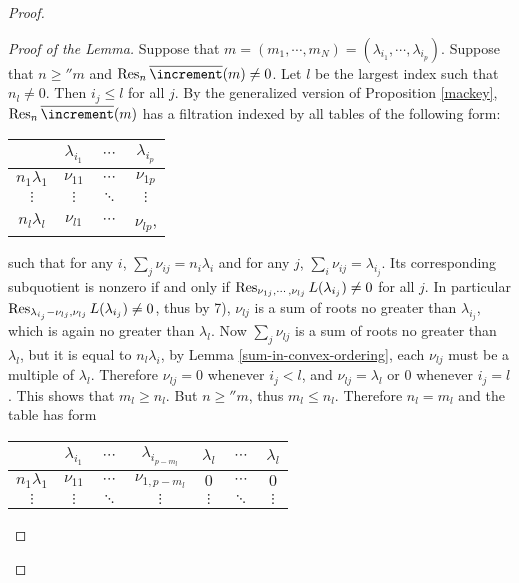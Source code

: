 \begin{proof}
    \begin{proof}[Proof of the Lemma]
        Suppose that $m = (m_1,\cdots,m_N) = (\lambda_{i_1},\cdots,\lambda_{i_p})$.
        Suppose that $n\ge''m$ and $\Res_n\pstd(m)\ne 0$.
        Let $l$ be the largest index such that $n_l\ne 0$.
        Then $i_j\le l$ for all $j$.
        By the generalized version of Proposition \ref{mackey},
        $\Res_n\pstd(m)$ has a filtration indexed by all tables of the following
        form:
        \begin{center}
            \begin{tabular}{c|ccc}
                &$\lambda_{i_1}$&$\cdots$&$\lambda_{i_p}$\\
                \hline
                $n_1\lambda_1$&$\nu_{11}$&$\cdots$&$\nu_{1p}$\\
                $\vdots$&$\vdots$&$\ddots$&$\vdots$\\
                $n_l\lambda_l$&$\nu_{l1}$&$\cdots$&$\nu_{lp}$,
            \end{tabular}
        \end{center}
        such that for any $i$, $\sum_j\nu_{ij} = n_i\lambda_i$ and for any $j$,
        $\sum_i\nu_{ij} = \lambda_{i_j}$. Its corresponding subquotient is nonzero
        if and only if $\operatorname{Res}_{\nu_{1j},\cdots,\nu_{lj}}L(\lambda_{i_j})\ne 0$
        for all $j$. In particular $\operatorname{Res}_{\lambda_{i_j}-\nu_{lj},\nu_{lj}}
        L(\lambda_{i_j})\ne 0$, thus by 7), $\nu_{lj}$ is a sum of roots no
        greater than $\lambda_{i_j}$, which is again no greater than $\lambda_l$.
        Now $\sum_j\nu_{lj}$ is a sum of roots no greater than $\lambda_l$,
        but it is equal to $n_l\lambda_i$, by Lemma \ref{sum-in-convex-ordering},
        each $\nu_{lj}$ must be a multiple of $\lambda_l$. Therefore 
        $\nu_{lj} = 0$ whenever $i_j<l$, and $\nu_{lj} = \lambda_l$ or $0$
        whenever $i_j = l$. This shows that $m_l\ge n_l$. But $n\ge''m$,
        thus $m_l\le n_l$. Therefore $n_l = m_l$ and the table has form
        \begin{center}
            \begin{tabular}{c|cccccc}
                &$\lambda_{i_1}$&$\cdots$&$\lambda_{i_{p-m_l}}$
                &$\lambda_l$&$\cdots$&$\lambda_l$\\
                \hline
                $n_1\lambda_1$&$\nu_{11}$&$\cdots$&$\nu_{1,p-m_l}$
                &$0$&$\cdots$&$0$\\
                $\vdots$&$\vdots$&$\ddots$&$\vdots$
                &$\vdots$&$\ddots$&$\vdots$\\

\end{tabular}
\end{center}
\end{proof}
\end{proof}
